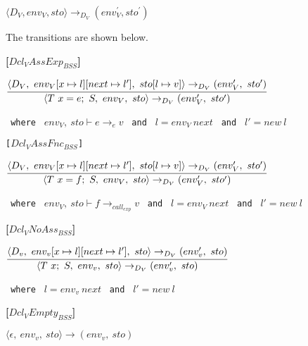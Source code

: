 {\begin{center}
	$\langle D_V,env_V,sto \rangle \rightarrow_{D_V} (env_V^{'} , sto^{'})$
\end{center}

The transitions are shown below.

\textbf{[$Dcl_VAssExp_{BSS}$]}\\
\begin{center}
	\begin{math}
	\cfrac
		{\langle D_V,\ env_V[x \mapsto l][next \mapsto l'],\ sto[l \mapsto v] \rangle \rightarrow_{D_V} (env_V',\ sto')}
		{\langle T\ x = e;\ S,\ env_V,\ sto \rangle \rightarrow_{D_V} (env_V',\ sto')}
	\end{math}
	
	\texttt{ where } $env_V,\ sto \vdash e \rightarrow_e v$
	\texttt{ and } $l = env_V\ next$
	\texttt{ and } $l' = new\ l$
\end{center}

\texttt{[$Dcl_VAssFnc_{BSS}$]}\\
\begin{center}
	\begin{math}
		\cfrac
			{\langle D_V,\ env_V[x \mapsto l][next \mapsto l'],\ sto[l \mapsto v] \rangle \rightarrow_{D_V} (env_V',\ sto')}
			{\langle T\ x = f;\ S,\ env_V,\ sto \rangle \rightarrow_{D_V} (env_V',\ sto')}		
	\end{math}
	
	\texttt{ where } $env_V,\ sto \vdash f \rightarrow_{call_{exp}} v$
	\texttt{ and } $l = env_V\ next$
	\texttt{ and } $l' = new\ l$
\end{center}

\textbf{[$Dcl_VNoAss_{BSS}$]}\\
\begin{center}
	\begin{math}
	\cfrac
		{\langle D_v,\ env_v[x \mapsto l][next \mapsto l'],\ sto \rangle \rightarrow_{D_V} (env_v',\ sto)}
		{\langle T\ x;\ S,\ env_v,\ sto \rangle \rightarrow_{D_V} (env_v',\ sto)}
	\end{math}
	
	\texttt{ where } $l = env_v\ next$
	\texttt{ and } $l' = new\ l$
\end{center}

\textbf{[$Dcl_VEmpty_{BSS}$]}\\
\begin{center}
	\begin{math}
	\langle \epsilon,\ env_v,\ sto \rangle \rightarrow (env_v,\ sto)
	\end{math}
\end{center}

}
